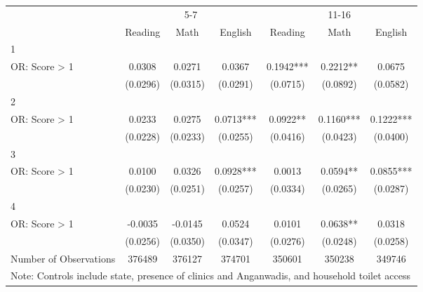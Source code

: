 {
\def\sym#1{\ifmmode^{#1}\else\(^{#1}\)\fi}
\begin{tabular}{l*{6}{c}}
\hline\hline
            &\multicolumn{3}{c}{5-7}&\multicolumn{3}{c}{11-16}\\\cmidrule(lr){2-4}\cmidrule(lr){5-7}
            &\multicolumn{1}{c}{Reading}&\multicolumn{1}{c}{Math}&\multicolumn{1}{c}{English}&\multicolumn{1}{c}{Reading}&\multicolumn{1}{c}{Math}&\multicolumn{1}{c}{English}\\
\hline
1           &    &    &    &    &    &    \\
OR: Score > 1&0.0308   &0.0271   &0.0367   &0.1942***&0.2212** &0.0675   \\
            &(0.0296)   &(0.0315)   &(0.0291)   &(0.0715)   &(0.0892)   &(0.0582)   \\
\hline
2           &    &    &    &    &    &    \\
OR: Score > 1&0.0233   &0.0275   &0.0713***&0.0922** &0.1160***&0.1222***\\
            &(0.0228)   &(0.0233)   &(0.0255)   &(0.0416)   &(0.0423)   &(0.0400)   \\
\hline
3           &    &    &    &    &    &    \\
OR: Score > 1&0.0100   &0.0326   &0.0928***&0.0013   &0.0594** &0.0855***\\
            &(0.0230)   &(0.0251)   &(0.0257)   &(0.0334)   &(0.0265)   &(0.0287)   \\
\hline
4           &    &    &    &    &    &    \\
OR: Score > 1&-0.0035   &-0.0145   &0.0524   &0.0101   &0.0638** &0.0318   \\
            &(0.0256)   &(0.0350)   &(0.0347)   &(0.0276)   &(0.0248)   &(0.0258)   \\
\hline
Number of Observations&376489   &376127   &374701   &350601   &350238   &349746   \\
\hline\hline
\multicolumn{7}{l}{\footnotesize Note: Controls include state, presence of clinics and Anganwadis, and household toilet access}\\
\end{tabular}
}
